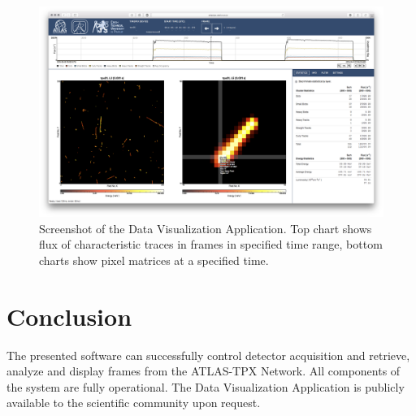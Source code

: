 \documentclass[journal]{IEEEtran}
\begin{document}
\begin{figure}[tbp]
	\centering
        \includegraphics[clip, width=.45\textwidth, angle = 0 ]{Plots/screen-tpx01-crosshair-zoomed.png}
	  \caption {Screenshot of the Data Visualization Application. \cite{Manek2016} Top chart shows flux of characteristic traces in frames in specified time range, bottom charts show pixel matrices at a specified time.}
    \label{fig:positions}
\end{figure}

\section{\label{sec:conclusion}Conclusion}
The presented software can successfully control detector acquisition and retrieve, analyze and display frames from the ATLAS-TPX Network. All components of the system are fully operational. The Data Visualization Application is publicly available to the scientific community upon request.


%

%
\end{document}
